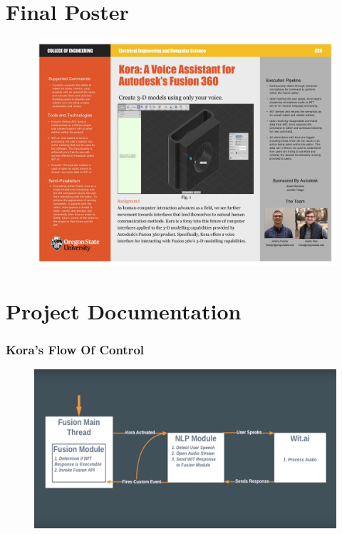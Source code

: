 \documentclass[onecolumn, draftclsnofoot,10pt, compsoc]{IEEEtran}
\begin{document}
\section{Final Poster}
	\begin{figure}[H]
		\includegraphics[width=19cm]{poster}
		\centering
	\end{figure}














\section{Project Documentation}



	\subsubsection{Kora's Flow Of Control}
		\begin{figure}[H]
			\includegraphics[width=19cm]{koraFlowChart}
			\centering
		\end{figure}
	
\end{document}
